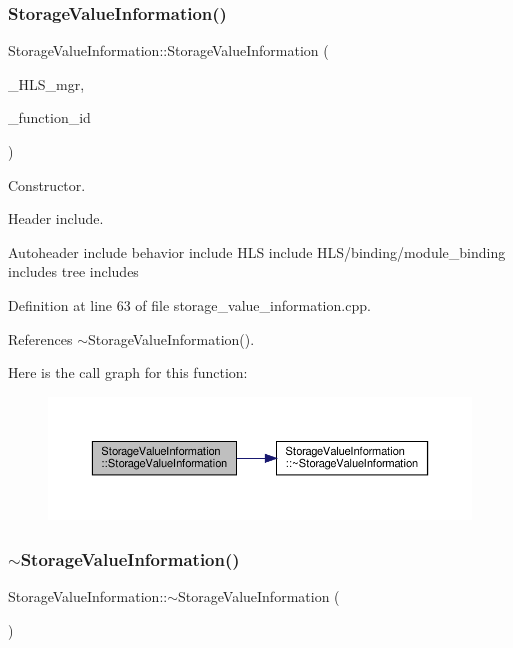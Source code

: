 \subsubsection{\texorpdfstring{Storage\+Value\+Information()}{StorageValueInformation()}}
{\footnotesize\ttfamily Storage\+Value\+Information\+::\+Storage\+Value\+Information (\begin{DoxyParamCaption}\item[{const \hyperlink{hls__manager_8hpp_a1b481383e3beabc89bd7562ae672dd8c}{H\+L\+S\+\_\+manager\+Const\+Ref}}]{\+\_\+\+H\+L\+S\+\_\+mgr,  }\item[{const unsigned int}]{\+\_\+function\+\_\+id }\end{DoxyParamCaption})}



Constructor. 

Header include.

Autoheader include behavior include H\+LS include H\+L\+S/binding/module\+\_\+binding includes tree includes 

Definition at line 63 of file storage\+\_\+value\+\_\+information.\+cpp.



References $\sim$\+Storage\+Value\+Information().

Here is the call graph for this function\+:
\nopagebreak
\begin{figure}[H]
\begin{center}
\leavevmode
\includegraphics[width=350pt]{d8/dbe/classStorageValueInformation_a19c290938cd6a5392a07064fe4789d3d_cgraph}
\end{center}
\end{figure}
\mbox{\label{classStorageValueInformation_add282b820dac0047dca2d2e7670338b8}} 
\subsubsection{\texorpdfstring{$\sim$\+Storage\+Value\+Information()}{~StorageValueInformation()}}
{\footnotesize\ttfamily Storage\+Value\+Information\+::$\sim$\+Storage\+Value\+Information (\begin{DoxyParamCaption}{ }\end{DoxyParamCaption})\hspace{0.3cm}{\ttfamily [default]}}



